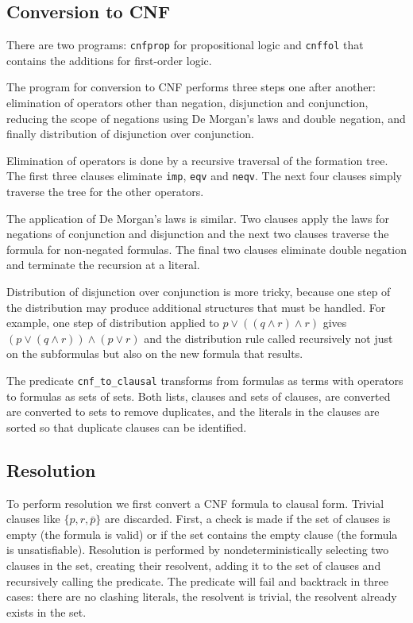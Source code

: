 \documentclass[11pt]{article}
\newcommand*{\p}[1]{\textup{\texttt{#1}}}
\begin{document}
\subsection{Conversion to CNF}\label{s.cnf}

There are two programs: \p{cnfprop} for propositional logic and
\p{cnffol} that contains the additions for first-order logic.

The program for conversion to CNF performs three steps one after
another: elimination of operators other than negation, disjunction and
conjunction, reducing the scope of negations using De Morgan's laws and
double negation, and finally distribution of disjunction over
conjunction.

Elimination of operators is done by a recursive traversal of the
formation tree. The first three clauses eliminate \p{imp}, \p{eqv} and
\p{neqv}. The next four clauses simply traverse the tree for the other
operators.

The application of De Morgan's laws is similar. Two clauses apply the
laws for negations of conjunction and disjunction and the next two
clauses traverse the formula for non-negated formulas. The final two
clauses eliminate double negation and terminate the recursion at a
literal.

Distribution of disjunction over conjunction is more tricky, because one
step of the distribution may produce additional structures that must be
handled. For example, one step of distribution applied to $p \vee
((q\wedge r) \wedge r)$ gives $(p \vee (q\wedge r)) \wedge (p \vee r)$
and the distribution rule called recursively not just on the subformulas
but also on the new formula that results.

The predicate \p{cnf\_to\_clausal} transforms from formulas as terms
with operators to formulas as sets of sets. Both lists, clauses and
sets of clauses, are converted are converted to sets to remove
duplicates, and the literals in the clauses are sorted so that duplicate
clauses can be identified.

\subsection{Resolution}\label{s.resprop}

To perform resolution we first convert a CNF formula to clausal form.
Trivial clauses like $\{p,r,\bar{p}\}$ are discarded. First, a check is
made if the set of clauses is empty (the formula is valid) or if the set
contains the empty clause (the formula is unsatisfiable). Resolution is
performed by nondeterministically selecting two clauses in the set,
creating their resolvent, adding it to the set of clauses and
recursively calling the predicate. The predicate will fail and backtrack
in three cases: there are no clashing literals, the resolvent is
trivial, the resolvent already exists in the set.
\end{document}
